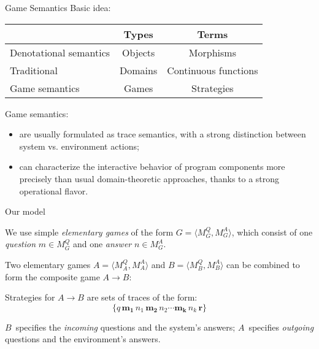 \documentclass{beamer}
\begin{document}
\begin{frame}{Game Semantics} %
Basic idea:
\begin{center}
  \begin{tabular}{lcc}
  \hline
   & Types & Terms \\
  \hline
  Denotational semantics & Objects & Morphisms \\
  \hspace{1em} Traditional & Domains & Continuous functions \\
  \hspace{1em} Game semantics & Games & Strategies \\
  \hline
  \end{tabular}
\end{center}

\vfill
Game semantics:
\begin{itemize}
\item
  are usually formulated as trace semantics,
  with a strong distinction between
  system vs. environment actions;
\item
  can characterize
  the interactive behavior of program components
  more precisely than
  usual domain-theoretic approaches,
  thanks to a strong operational flavor.
\end{itemize}
\vfill
\end{frame}

\begin{frame}{Our model} %

We use simple
\emph{elementary games}
of the form $G = \langle M_G^Q, M_G^A \rangle$,
which consist of
one \emph{question} $m \in M_G^Q$ and
one \emph{answer} $n \in M_G^A$.

\vspace{1ex}
Two elementary games
$A = \langle M_A^Q, M_A^A \rangle$ and
$B = \langle M_B^Q, M_B^A \rangle$
can be combined to form
the composite game $A \rightarrow B$:
\begin{center}
\end{center}

Strategies for $A \rightarrow B$ are sets of traces of the form:
\[
   \{ q \, \mathbf{m_1} \, n_1 \, \mathbf{m_2} \, n_2 \cdots \mathbf{m_k} \, n_k \, \mathbf{r} \}
\]

$B$~specifies the \emph{incoming} questions
and the system's answers;
$A$~specifies \emph{outgoing}
questions and the environment's answers.
\end{frame}
\end{document}
